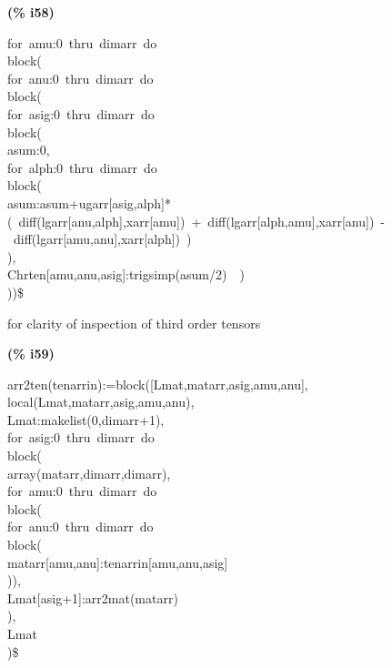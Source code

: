 \documentclass[fleqn]{article}
\begin{document}
\noindent
\begin{minipage}[t]{4.000000em}\color{red}\bfseries
(\% i58)	
\end{minipage}
\begin{minipage}[t]{\textwidth}\color{blue}
for\ amu:0\ thru\ dimarr\ do\\
block(\\
for\ anu:0\ thru\ dimarr\ do\\
block(\\
for\ asig:0\ thru\ dimarr\ do\\
block(\\
asum:0,\\
for\ alph:0\ thru\ dimarr\ do\\
block(\\
asum:asum+ugarr[asig,alph]*(\ diff(lgarr[anu,alph],xarr[amu])\ +\ diff(lgarr[alph,amu],xarr[anu])\ -\ diff(lgarr[amu,anu],xarr[alph])\ )\\
),\\
Chrten[amu,anu,asig]:trigsimp(asum/2)\ \ )\\
))\$
\end{minipage}

\noindent%

for clarity of inspection of third order tensors


\noindent
\begin{minipage}[t]{4.000000em}\color{red}\bfseries
(\% i59)	
\end{minipage}
\begin{minipage}[t]{\textwidth}\color{blue}
arr2ten(tenarrin):=block([Lmat,matarr,asig,amu,anu],\\
local(Lmat,matarr,asig,amu,anu),\\
Lmat:makelist(0,dimarr+1),\\
for\ asig:0\ thru\ dimarr\ do\\
block(\\
array(matarr,dimarr,dimarr),\\
for\ amu:0\ thru\ dimarr\ do\\
block(\\
for\ anu:0\ thru\ dimarr\ do\\
block(\\
matarr[amu,anu]:tenarrin[amu,anu,asig]\\
)),\\
Lmat[asig+1]:arr2mat(matarr)\\
),\\
Lmat\\
)\$
\end{minipage}
\end{document}
